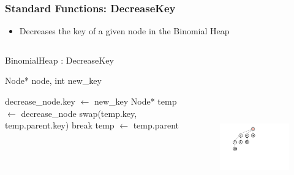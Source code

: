 \documentclass[13pt]{beamer}
\begin{document}
\begin{frame}
\frametitle{Standard Functions: DecreaseKey}
  \begin{itemize}
    \item Decreases the key of a given node in the Binomial Heap
  \end{itemize}

  \begin{columns}[T] %
    \begin{column}[T]{6cm} %
        \begin{algorithm}[H]
        \small
        \caption{BinomialHeap : DecreaseKey}
        \begin{algorithmic}
          \REQUIRE Node* node, int new\_key

          \STATE decrease\_node.key $\leftarrow$ new\_key
          \STATE Node* temp $\leftarrow$ decrease\_node
                \STATE swap(temp.key, temp.parent.key)
              \ELSE
                \STATE break
              \ENDIF
              \STATE temp $\leftarrow$ temp.parent
          \ENDWHILE
        \end{algorithmic}
        \end{algorithm}
    \end{column}
    \begin{column}[T]{7.5cm} %
      \begin{figure}
        \includegraphics[height=8cm]{./img/decreasekeyD.png}
      \end{figure}
    \end{column}
  \end{columns}

\end{frame}
\end{document}
